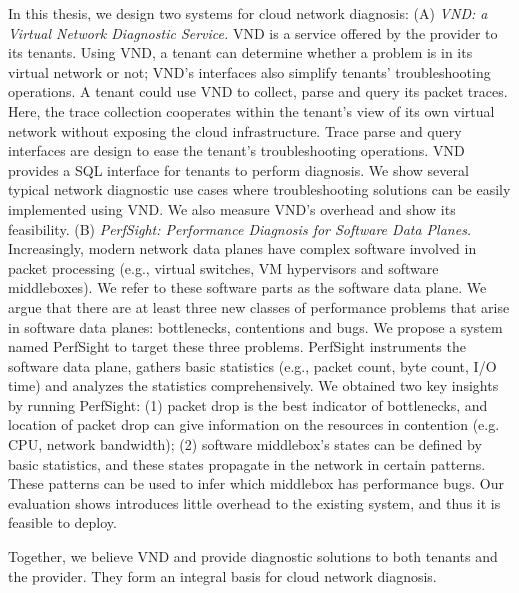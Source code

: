 In this thesis, we design two systems for cloud network diagnosis: (A) \emph{VND: a Virtual Network 
Diagnostic Service.} VND is a service offered by the provider to its tenants.
Using VND, a tenant can determine whether a problem is in its virtual network or not; 
VND's interfaces also simplify tenants' troubleshooting operations. A tenant could use VND to 
collect, parse and query its packet traces. Here, the trace collection cooperates within
the tenant's view of its own virtual network without exposing the cloud infrastructure. 
Trace parse and query interfaces are design to ease the tenant's troubleshooting operations. 
VND provides a SQL interface for tenants to perform diagnosis. We show several typical 
network diagnostic use cases where troubleshooting solutions can be easily implemented using VND. 
We also measure VND's overhead and show its feasibility.
(B) \emph{PerfSight: Performance Diagnosis for Software Data Planes.}
Increasingly, modern network data planes have 
complex software involved in packet processing (e.g., virtual switches, VM hypervisors and software middleboxes).
We refer to these software parts as the software data plane. We argue that there are at least three new
classes of performance problems that arise in software data planes: bottlenecks, contentions and bugs. 
We propose 
a system named PerfSight to target these three problems. PerfSight instruments the software 
data plane, gathers basic statistics (e.g., packet count, byte count, I/O time) and analyzes the 
statistics comprehensively. We obtained two key insights by running PerfSight: (1) packet drop is the best 
indicator of bottlenecks, and location of packet drop can give information on the resources in contention 
(e.g. CPU, network bandwidth); (2) software middlebox's states can be defined by basic statistics, 
and these states propagate in the network in certain patterns. These patterns can be used 
to infer which middlebox has performance bugs. 
Our evaluation shows \Name introduces little overhead to the existing system, and thus it is 
feasible to deploy.

Together, we believe VND and \Name provide diagnostic solutions to both tenants and the provider. 
They form an integral basis for cloud network diagnosis.
